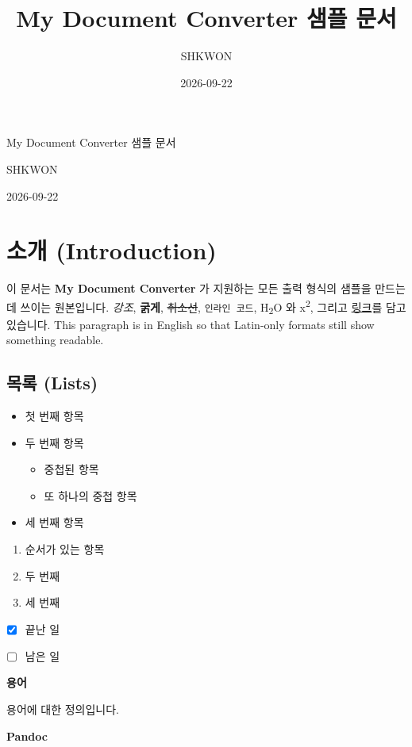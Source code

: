 \documentclass[11pt]{article}
\title{My Document Converter 샘플 문서}
\author{SHKWON}
\date{2026-09-22}
\begin{document}
\maketitle

My Document Converter 샘플 문서

SHKWON

2026-09-22

\section*{소개 (Introduction)}\label{소개-introduction}

이 문서는 \textbf{My Document Converter} 가 지원하는 모든 출력 형식의 샘플을 만드는 데 쓰이는
원본입니다. \emph{강조}, \textbf{굵게}, \sout{취소선}, \verb|인라인 코드|,
H\textsubscript{2}O 와 x\textsuperscript{2}, 그리고
\href{https://example.com}{링크}를 담고 있습니다. This paragraph is in English so
that Latin-only formats still show something readable.

\subsection*{목록 (Lists)}\label{목록-lists}

\begin{itemize}
\item 첫 번째 항목
\item 두 번째 항목
\begin{itemize}
\item 중첩된 항목
\item 또 하나의 중첩 항목
\end{itemize}
\item 세 번째 항목
\end{itemize}

\begin{enumerate}
\item 순서가 있는 항목
\item 두 번째
\item 세 번째
\end{enumerate}

\begin{itemize}
\item ☒ 끝난 일
\item ☐ 남은 일
\end{itemize}

\textbf{용어}

용어에 대한 정의입니다.

\textbf{Pandoc}
\end{document}
